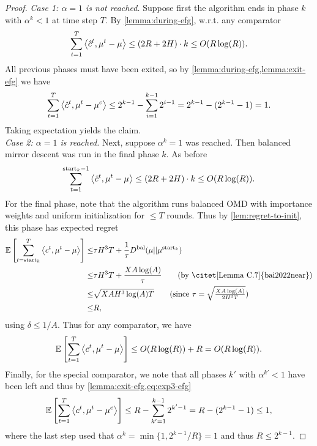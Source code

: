 \thmUbInteriorEfg*

\begin{proof}
    \emph{Case 1: $\alpha=1$ is not reached.} Suppose first the algorithm ends in phase $k$ with $\alpha^k<1$ at time step $T$. By \cref{lemma:during-efg}, w.r.t. any comparator 
    \begin{align*}
        \sum_{t=1}^T \left\langle \hat{c}^t, \mu^t-\mu \right\rangle \leq (2R+2H) \cdot k \leq O(R \log(R)).
    \end{align*}
    All previous phases must have been exited, so by \cref{lemma:during-efg,lemma:exit-efg} we have 
    \begin{align*}
        \sum_{t=1}^T \left\langle \hat{c}^t, \mu^t-\mu^c \right\rangle \leq 2^{k-1} - \sum_{i=1}^{k-1} 2^{i-1} = 2^{k-1} - (2^{k-1}-1) = 1.
    \end{align*}
    Taking expectation yields the claim.\\

    \noindent\emph{Case 2: $\alpha=1$ is reached.} Next, suppose $\alpha^k=1$ was reached. Then balanced mirror descent was run in the final phase $k$. As before
    \begin{align*}
        \sum_{t=1}^{\text{start}_{k}-1} \left\langle \hat{c}^t, \mu^t-\mu \right\rangle \leq (2R+2H) \cdot k \leq O(R \log(R)).
    \end{align*}
    For the final phase, note that the algorithm runs balanced OMD with importance weights and uniform initialization for $\leq T$ rounds. Thus by \cref{lem:regret-to-init}, this phase has expected regret 
    \begin{align}
        \exptn\rectangular{\sum_{t=\start_{k}}^T \inner{c^t}{\mu^t-\mu}} \leq& \tau H^3T + \frac{1}{\tau}\Dbal(\mu || \mu^{\start_{k}}) \nonumber\\
        \leq& \tau H^3T + \frac{XA\log(A)}{\tau} \tag{by \citet[Lemma C.7]{bai2022near}}\nonumber\\
        \leq& \sqrt{XAH^3\log(A)T} \tag{since $\tau=\sqrt{\frac{XA\log(A)}{2H^3T}}$}\nonumber\\
        \leq& R, \label{eq:exp3-efg}
    \end{align}
    using $\delta\leq1/A$. Thus for any comparator, we have 
    \begin{align*}
        \mathbb{E}\left[ \sum_{t=1}^T \left\langle c^t, \mu^t - \mu \right\rangle \right] \leq O(R\log(R)) + R = O(R\log(R)).
    \end{align*}
    Finally, for the special comparator, we note that all phases $k'$ with $\alpha^{k'}<1$ have been left and thus by \cref{lemma:exit-efg,eq:exp3-efg}
    \begin{align*}
        \mathbb{E}\left[ \sum_{t=1}^T \left\langle c^t, \mu^t - \mu^c \right\rangle \right] \leq R - \sum_{k'=1}^{k-1} 2^{k'-1}= R - (2^{k-1}-1) \leq 1,
    \end{align*}
    where the last step used that $\alpha^k=\min\{1,2^{k-1}/R\}=1$ and thus $R\leq2^{k-1}$.
\end{proof}

